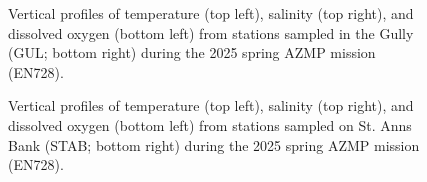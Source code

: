 \documentclass[12pt]{article}\usepackage[]{graphicx}\usepackage[]{color}
\begin{document}
\begin{appendices}
\begin{figure}[htb]
{}

\caption{Vertical profiles of temperature (top left), salinity (top right), and dissolved oxygen (bottom left) from stations sampled in the Gully (GUL; bottom right) during the 2025 spring AZMP mission (EN728).}\label{fig:figureA8}
\end{figure}
\clearpage
\begin{figure}[htb]

{\centering {} 

}

\caption{Vertical profiles of temperature (top left), salinity (top right), and dissolved oxygen (bottom left) from stations sampled on St. Anns Bank (STAB; bottom right) during the 2025 spring AZMP mission (EN728).}\label{fig:figureA9}
\end{figure}
\clearpage
\begin{figure}[htb]

{\centering {} 

}
\end{figure}
\end{appendices}
\end{document}
